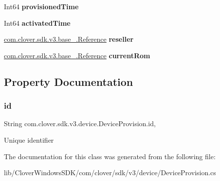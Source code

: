 \begin{DoxyCompactItemize}
Int64 {\bfseries provisioned\+Time}
\item 
\mbox{\label{classcom_1_1clover_1_1sdk_1_1v3_1_1device_1_1_device_provision_a0d4bf5111906b2d5294f3996f0d7738c}} 
Int64 {\bfseries activated\+Time}
\item 
\mbox{\label{classcom_1_1clover_1_1sdk_1_1v3_1_1device_1_1_device_provision_a06ef63395e9dd9c57461fbd4fcb36a30}} 
\hyperlink{classcom_1_1clover_1_1sdk_1_1v3_1_1base___1_1_reference}{com.\+clover.\+sdk.\+v3.\+base\+\_\+.\+Reference} {\bfseries reseller}
\item 
\mbox{\label{classcom_1_1clover_1_1sdk_1_1v3_1_1device_1_1_device_provision_ac057ac577e880965c7c3a844b1551939}} 
\hyperlink{classcom_1_1clover_1_1sdk_1_1v3_1_1base___1_1_reference}{com.\+clover.\+sdk.\+v3.\+base\+\_\+.\+Reference} {\bfseries current\+Rom}
\end{DoxyCompactItemize}


\subsection{Property Documentation}
\mbox{\label{classcom_1_1clover_1_1sdk_1_1v3_1_1device_1_1_device_provision_abab796593b04ec6e752cd56294a61a12}} 
\subsubsection{\texorpdfstring{id}{id}}
{\footnotesize\ttfamily String com.\+clover.\+sdk.\+v3.\+device.\+Device\+Provision.\+id\hspace{0.3cm}{\ttfamily [get]}, {\ttfamily [set]}}



Unique identifier 



The documentation for this class was generated from the following file\+:\begin{DoxyCompactItemize}
\item 
lib/\+Clover\+Windows\+S\+D\+K/com/clover/sdk/v3/device/Device\+Provision.\+cs\end{DoxyCompactItemize}
